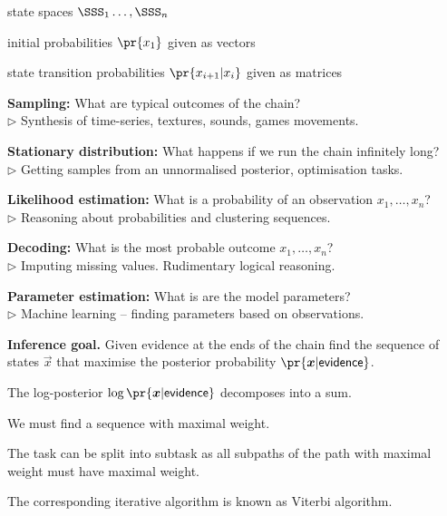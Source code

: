 \documentclass[landscape,footrule]{foils}
\begin{document}
\begin{triangles}
\item state spaces $\SSS_1\ldots,\SSS_n$
\item initial probabilities $\pr{x_1}$ given as vectors 
\item state transition probabilities $\pr{x_{i+1}|x_{i}}$ given as matrices
\end{triangles}


\textbf{Sampling:} What are typical outcomes of the chain?\\
$\triangleright$ Synthesis of time-series, textures, sounds, games movements. 
\vspace*{1.5ex} 

\textbf{Stationary distribution:} What happens if we run the chain infinitely long?\\
$\triangleright$ Getting samples from an unnormalised posterior, optimisation tasks. 
\vspace*{1.5ex}  

\textbf{Likelihood estimation:} What is a probability of an observation $x_1,\ldots,x_n$?\\
$\triangleright$ Reasoning about probabilities and clustering sequences.
\vspace*{1.5ex} 

\textbf{Decoding:} What is the most probable outcome $x_1,\ldots,x_n$?\\ 
$\triangleright$ Imputing missing values. Rudimentary logical reasoning. 
\vspace*{1.5ex} 

\textbf{Parameter estimation:} What is are the model parameters?\\
$\triangleright$ Machine learning -- finding parameters based on observations.



\textbf{Inference goal.}
Given evidence at the ends of the chain find the sequence of states $\vec{x}$ that maximise the posterior probability $\pr{\vec{x}|\mathsf{evidence}}$.
\begin{triangles}
\item The log-posterior $\log\pr{\vec{x}|\mathsf{evidence}}$ decomposes into a sum.
\item We must find a sequence with maximal weight.
\item The task can be split into subtask as all subpaths of the path with maximal weight must have maximal weight. 
\item The corresponding iterative algorithm is known as Viterbi algorithm.
\end{triangles}
\end{document}
